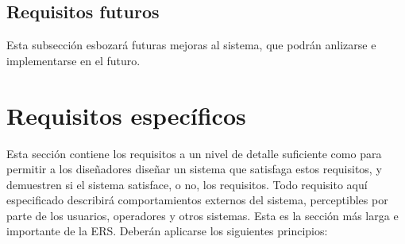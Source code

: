 \documentclass[12pt,a4paper, twosite]{article}
\begin{document}
\subsection{Requisitos futuros}
\label{sec:org33cfcdb}

Esta subsección esbozará futuras mejoras al sistema, que podrán
anlizarse e implementarse en el futuro.   


\section{Requisitos específicos}
\label{sec:org40573d1}

Esta sección contiene los requisitos a un nivel de detalle suficiente
como para permitir a los diseñadores diseñar un sistema que
satisfaga estos requisitos, y demuestren si el sistema satisface, o
no, los requisitos. Todo requisito aquí especificado describirá
comportamientos externos del sistema, perceptibles por parte de los
usuarios, operadores y otros sistemas. Esta es la sección más larga
e importante de la ERS. Deberán aplicarse los siguientes principios:
\end{document}
